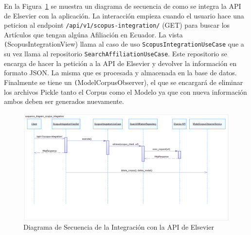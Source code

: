 En la Figura~\ref{fig:sequence-diagram-scopus-integration} se muestra un diagrama de secuencia de como se integra la API de Elsevier con la aplicación.
La interacción empieza cuando el usuario hace una peticion al endpoint \texttt{/api/v1/scopus-integration/} (GET) para buscar los Artículos que tengan algúna Afiliación en Ecuador.
La vista \texttt(ScopusIntegrationView) llama al caso de uso \texttt{ScopusIntegrationUseCase} que a su vez llama al repositorio \texttt{SearchAffiliationUseCase}.
Este repositorio se encarga de hacer la petición a la API de Elsevier y devolver la información en formato JSON\@.
La misma que es procesada y almacenada en la base de datos. Finalmente se tiene un \texttt(ModelCorpusObserver), el que se encargará de eliminar los archivos Pickle tanto el Corpus como el Modelo ya que con nueva información
ambos deben ser generados nuevamente.

\begin{figure}[H]
    \centering
    \includegraphics[scale=0.5]{../02Figures/02Chapter/Sprints/Sprint-5/sequence_diagram_scopus_integration.png}
    \caption{Diagrama de Secuencia de la Integración con la API de Elsevier}\label{fig:sequence-diagram-scopus-integration}
\end{figure}

